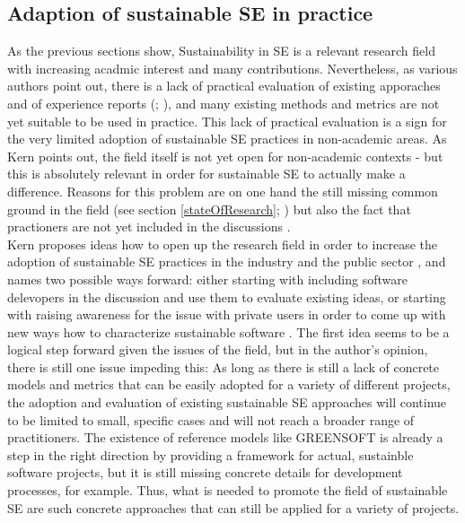 \documentclass[oribibl]{llncs}
\begin{document}
\subsection{Adaption of sustainable SE in practice}%
As the previous sections show, Sustainability in SE is a relevant research field with increasing acadmic interest and many contributions. Nevertheless, as various authors point out, there is a lack of practical evaluation of existing apporaches and of experience reports (\cite{penzenstadler_sustainability_2012}; \cite{penzenstadler_systematic_2014}), and many existing methods and metrics are not yet suitable to be used in practice. %
This lack of practical evaluation is a sign for the very limited adoption of sustainable SE practices in non-academic areas. As Kern \cite{kern_how_2016} points out, the field itself is not yet open for non-academic contexts - but this is absolutely relevant in order for sustainable SE to actually make a difference. Reasons for this problem are on one hand the still missing common ground in the field (see section \ref{stateOfResearch}; \cite{kern_how_2016}) but also the fact that practioners are not yet included in the discussions \cite{kern_how_2016}.\\
Kern proposes ideas how to open up the research field in order to increase the adoption of sustainable SE practices in the industry and the public sector \cite{kern_how_2016}, and names two possible ways forward: either starting with including software delevopers in the discussion and use them to evaluate existing ideas, or starting with raising awareness for the issue with private users in order to come up with new ways how to characterize sustainable software \cite{kern_how_2016}. The first idea seems to be a logical step forward given the issues of the field, but in the author's opinion, there is still one issue impeding this: As long as there is still a lack of concrete models and metrics that can be easily adopted for a variety of different projects, the adoption and evaluation of existing sustainable SE approaches will continue to be limited to small, specific cases and will not reach a broader range of practitioners. The existence of reference models like GREENSOFT is already a step in the right direction by providing a framework for actual, sustainble software projects, but it is still missing concrete details for development processes, for example. Thus, what is needed to promote the field of sustainable SE are such concrete approaches that can still be applied for a variety of projects. %
\end{document}
